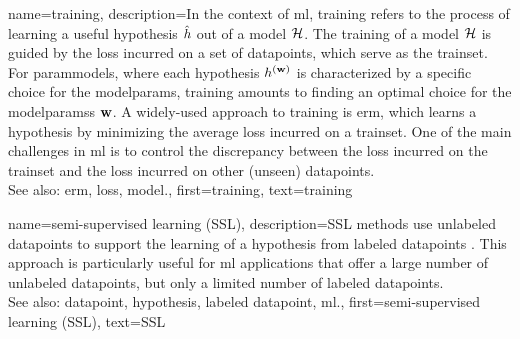 {name={training}, 
	description={In the context of \gls{ml}, training refers to the process 
	of learning a useful \gls{hypothesis} $\hat{h}$ out of a \gls{model} $\mathcal{H}$. 
	The training of a \gls{model} $\mathcal{H}$ is guided by the \gls{loss} incurred on a set 
	of \glspl{datapoint}, which serve as the \gls{trainset}. For \glspl{parammodel}, 
	where each \gls{hypothesis} $h^{({\bf w})}$ is characterized by a specific 
	choice for the \gls{modelparams}, training amounts to finding an optimal choice for the 
	\glspl{modelparams} ${\bf w}$. A widely-used approach to training is \gls{erm}, which 
	learns a \gls{hypothesis} by minimizing the average \gls{loss} incurred on a \gls{trainset}. 
	One of the main challenges in \gls{ml} is to control the discrepancy between the 
	\gls{loss} incurred on the \gls{trainset} and the \gls{loss} incurred on other (unseen) \glspl{datapoint}.
				\\
		See also: \gls{erm}, \gls{loss}, \gls{model}.},
	    first={training},
	    text={training} 
}


{name={semi-supervised learning (SSL)}, 
	description={SSL methods use unlabeled \glspl{datapoint}
		to support the learning of a \gls{hypothesis} from \glspl{labeled datapoint} \cite{SemiSupervisedBook}. 
		This approach is particularly useful for \gls{ml} applications that offer a large number of 
		unlabeled \glspl{datapoint}, but only a limited number of \glspl{labeled datapoint}.
			\\
		See also: \gls{datapoint}, \gls{hypothesis}, \gls{labeled datapoint}, \gls{ml}.}, 
	first={semi-supervised learning (SSL)},
	text={SSL} 
}
	
